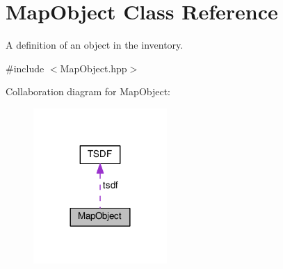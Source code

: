 \hypertarget{classMapObject}{}\section{Map\+Object Class Reference}
\label{classMapObject}


A definition of an object in the inventory.  




{\ttfamily \#include $<$Map\+Object.\+hpp$>$}



Collaboration diagram for Map\+Object\+:\nopagebreak
\begin{figure}[H]
\begin{center}
\leavevmode
\includegraphics[width=144pt]{classMapObject__coll__graph}
\end{center}
\end{figure}
